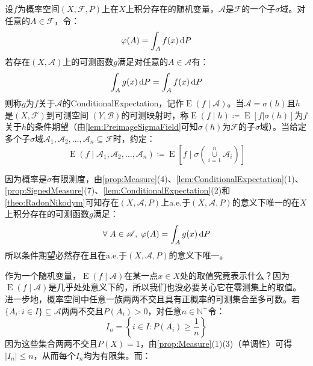 \begin{definition}
	设$f$为概率空间$(X,\mathscr{F},P)$上在$X$上积分存在的随机变量，$\mathscr{A}$是$\mathscr{F}$的一个子$\sigma$域。对任意的$A\in\mathscr{F}$，令：
	\begin{equation*}
		\varphi(A)=\int_{A}f(x)\mathop{}\!\mathrm{d} P
	\end{equation*}
	若存在$(X,\mathscr{A})$上的可测函数$g$满足对任意的$A\in\mathscr{A}$有：
	\begin{equation*}
		\int_{A}g(x)\mathop{}\!\mathrm{d} P=\int_{A}f(x)\mathop{}\!\mathrm{d} P
	\end{equation*}
	则称$g$为$f$关于$\mathscr{A}$的\gls{ConditionalExpectation}，记作$\operatorname{E}(f\mid\mathscr{A})$。当$\mathscr{A}=\sigma(h)$且$h$是$(X,\mathscr{F})$到可测空间 $(Y,\mathscr{B})$的可测映射时，称$\operatorname{E}(f\mid h)\coloneq\operatorname{E}[f|\sigma(h)]$为$f$关于$h$的条件期望（由\cref{lem:PreimageSigmaField}可知$\sigma(h)$为$\mathscr{F}$的子$\sigma$域）。当给定多个子$\sigma$域$\mathscr{A}_1,\mathscr{A}_2,\dots,\mathscr{A}_n\subseteq\mathscr{F}$时，约定：
	\begin{equation*}
		\operatorname{E}(f\mid\mathscr{A}_1,\mathscr{A}_2,\dots,\mathscr{A}_n)\coloneq\operatorname{E}\left[f\mid\sigma\left(\underset{i=1}{\overset{n}{\cup}}\mathscr{A}_i\right)\right]
	\end{equation*}
\end{definition}
\begin{note}
	因为概率是$\sigma$有限测度，由\cref{prop:Measure}(4)、\cref{lem:ConditionalExpectation}(1)、\cref{prop:SignedMeasure}(7)、\cref{lem:ConditionalExpectation}(2)和\cref{theo:RadonNikodym}可知存在$(X,\mathscr{A},P)$上a.e.于$(X,\mathscr{A},P)$的意义下唯一的在$X$上积分存在的可测函数$g$满足：
	\begin{equation*}
		\forall\;A\in\mathscr{A},\;\varphi(A)=\int_{A}g(x)\mathop{}\!\mathrm{d} P
	\end{equation*}
	所以条件期望必然存在且在a.e.于$(X,\mathscr{A},P)$的意义下唯一。
\end{note}
作为一个随机变量，$\operatorname{E}(f\mid\mathscr{A})$在某一点$x\in X$处的取值究竟表示什么？因为$\operatorname{E}(f\mid\mathscr{A})$是几乎处处意义下的，所以我们也没必要关心它在零测集上的取值。进一步地，概率空间中任意一族两两不交且具有正概率的可测集合至多可数。若$\{A_i:i\in I\}\subseteq\mathscr{A}$两两不交且$P(A_i)>0$，对任意$n\in\mathbb{N}^{+}$令：
\begin{equation*}
	I_n=\left\{i\in I:P(A_i)\geqslant\frac{1}{n}\right\}
\end{equation*}
因为这些集合两两不交且$P(X)=1$，由\cref{prop:Measure}(1)(3)（单调性）可得$|I_n|\leqslant n$，从而每个$I_n$均为有限集。而：
